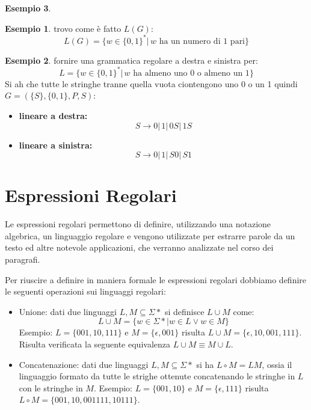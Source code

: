 \documentclass[a4paper]{book}
\theoremstyle{definition}%
\newtheorem*{esempio}{Esempio}
\begin{document}
\begin{esempio}
\begin{esempio}
trovo come è fatto $L(G)$:
$$L(G)=\{w\in\{0,1\}^*|\, w \mbox{ ha un numero di 1 pari}\}$$
\end{esempio}
\begin{esempio}
fornire una grammatica regolare a destra e sinistra per:
$$L=\{w\in\{0,1\}^*|\, w \mbox{ ha almeno uno 0 o almeno un 1}\}$$
Si ah che tutte le stringhe tranne quella vuota ciontengono uno 0 o un 1
quindi  $G=(\{S\},\{0,1\},P,S)$:
\begin{itemize}
\item \textbf{lineare a destra:}
$$S\to 0|\,1|\,0S|\,1S$$
\item \textbf{lineare a sinistra:} 
$$S\to 0|\,1|\,S0|\,S1$$
\end{itemize}
\end{esempio}

\section{Espressioni Regolari}
  Le espressioni regolari permettono di definire, utilizzando una notazione algebrica, un linguaggio regolare e vengono utilizzate
  per estrarre parole da un testo ed altre notevole applicazioni, che verranno analizzate nel corso dei paragrafi.

  Per riuscire a definire in maniera formale le espressioni regolari dobbiamo definire le seguenti operazioni sui linguaggi regolari:
  \begin{itemize}
  \item Unione: dati due linguaggi $L,M \subseteq \Sigma*$ si definisce $L \cup M$ come:
    \[ L \cup M = \{w \in \Sigma* | w \in L \lor w \in M\} \] 
    Esempio: $L = \{001, 10, 111\}$ e $M = \{\epsilon, 001\}$ risulta $L \cup M = \{\epsilon, 10, 001, 111\}$.\newline
    Risulta verificata la seguente equivalenza $L\cup M \equiv M\cup L$.

  \item Concatenazione: dati due linguaggi $L, M \subseteq \Sigma*$ si ha $L \circ M = LM$, ossia il linguaggio formato da tutte le strighe
    ottenute concatenando le stringhe in $L$ con le stringhe in $M$.
    Esempio: $L = \{001,10\}$ e $M = \{\epsilon, 111\}$ risulta $L \circ M = \{001, 10, 001111, 10111\}$.
    

\end{itemize}
\end{esempio}
\end{document}
